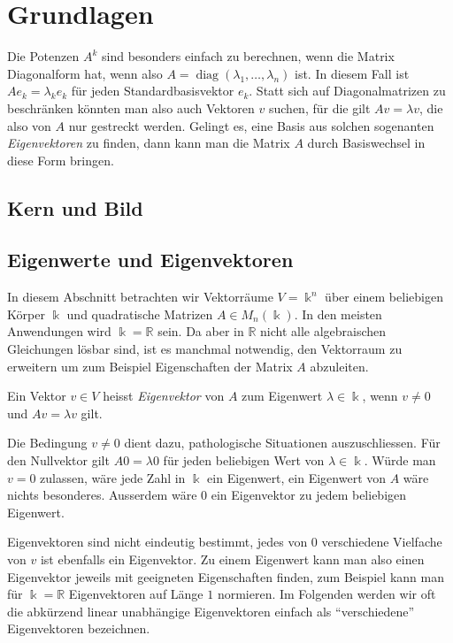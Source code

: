 %
%
%
\section{Grundlagen
\label{buch:section:grundlagen}}
Die Potenzen $A^k$ sind besonders einfach zu berechnen, wenn die Matrix
Diagonalform hat, wenn also $A=\operatorname{diag}(\lambda_1,\dots,\lambda_n)$
ist.
In diesem Fall ist $Ae_k=\lambda_k e_k$ für jeden Standardbasisvektor $e_k$.
Statt sich auf Diagonalmatrizen zu beschränken könnten man also auch
Vektoren $v$ suchen, für die gilt $Av=\lambda v$, die also von $A$ nur
gestreckt werden.
Gelingt es, eine Basis aus solchen sogenanten {\em Eigenvektoren} zu finden,
dann kann man die Matrix $A$ durch Basiswechsel in diese Form bringen.

%
%
%
\subsection{Kern und Bild
\label{buch:subsection:kern-und-bild}}

%
%
\subsection{Eigenwerte und Eigenvektoren
\label{buch:subsection:eigenwerte-und-eigenvektoren}}
In diesem Abschnitt betrachten wir Vektorräume $V=\Bbbk^n$ über einem
beliebigen Körper $\Bbbk$ und quadratische Matrizen
$A\in M_n(\Bbbk)$.
In den meisten Anwendungen wird $\Bbbk=\mathbb{R}$ sein.
Da aber in $\mathbb{R}$ nicht alle algebraischen Gleichungen lösbar sind,
ist es manchmal notwendig, den Vektorraum zu erweitern um zum Beispiel
Eigenschaften der Matrix $A$ abzuleiten.

\begin{definition}
Ein Vektor $v\in V$ heisst {\em Eigenvektor} von $A$ zum Eigenwert
$\lambda\in\Bbbk$, wenn $v\ne 0$ und $Av=\lambda v$ gilt.
\end{definition}

Die Bedingung $v\ne 0$ dient dazu, pathologische Situationen auszuschliessen.
Für den Nullvektor gilt $A0=\lambda 0$ für jeden beliebigen Wert von
$\lambda\in\Bbbk$.
Würde man $v=0$ zulassen, wäre jede Zahl in $\Bbbk$ ein Eigenwert,
ein Eigenwert von $A$ wäre nichts besonderes.
Ausserdem wäre $0$ ein Eigenvektor zu jedem beliebigen Eigenwert.

Eigenvektoren sind nicht eindeutig bestimmt, jedes von $0$ verschiedene
Vielfache von $v$ ist ebenfalls ein Eigenvektor.
Zu einem Eigenwert kann man also einen Eigenvektor jeweils mit 
geeigneten Eigenschaften finden, zum Beispiel kann man für $\Bbbk = \mathbb{R}$
Eigenvektoren auf Länge $1$ normieren.
Im Folgenden werden wir oft die abkürzend linear unabhängige Eigenvektoren
einfach als ``verschiedene'' Eigenvektoren bezeichnen.

